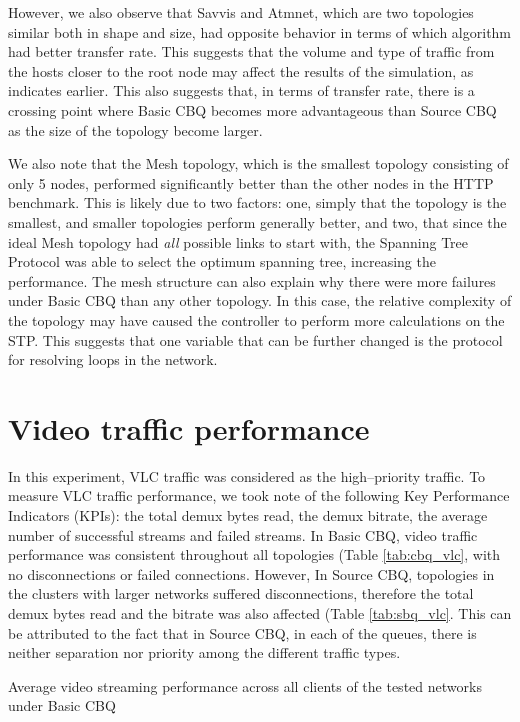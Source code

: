 However, we also observe that Savvis and Atmnet, which are two topologies similar both in shape and size, had opposite behavior in terms of which algorithm had better transfer rate. This suggests that the volume and type of traffic from the hosts closer to the root node may affect the results of the simulation, as indicates earlier. This also suggests that, in terms of transfer rate, there is a crossing point where Basic CBQ becomes more advantageous than Source CBQ as the size of the topology become larger.

We also note that the Mesh topology, which is the smallest topology consisting of only 5 nodes, performed significantly better than the other nodes in the HTTP benchmark. This is likely due to two factors: one, simply that the topology is the smallest, and smaller topologies perform generally better, and two, that since the ideal Mesh topology had \textit{all} possible links to start with, the Spanning Tree Protocol was able to select the optimum spanning tree, increasing the performance. The mesh structure can also explain why there were more failures under Basic CBQ than any other topology. In this case, the relative complexity of the topology may have caused the controller to perform more calculations on the STP. This suggests that one variable that can be further changed is the protocol for resolving loops in the network.

\section{Video traffic performance}
In this experiment, VLC traffic was considered as the high--priority traffic. To measure VLC traffic performance, we took note of the following Key Performance Indicators (KPIs): the total demux bytes read, the demux bitrate, the average number of successful streams and failed streams. In Basic CBQ, video traffic performance was consistent throughout all topologies (Table \ref{tab:cbq_vlc}, with no disconnections or failed connections. However, In Source CBQ, topologies in the clusters with larger networks suffered disconnections, therefore the total demux bytes read and the bitrate was also affected (Table \ref{tab:sbq_vlc}. This can be attributed to the fact that in Source CBQ, in each of the queues, there is neither separation nor priority among the different traffic types.

\begin{table}[htbp]
    \caption{Average video streaming performance across all clients of the tested networks under Basic CBQ}
    \centering
    
    \label{tab:cbq_vlc}
\end{table}

